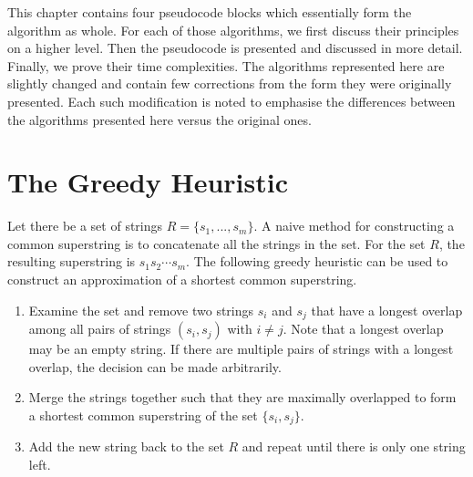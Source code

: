 \documentclass[english,twoside,censored,csm,algorithms-track-2020]{HYthesisML}
\theoremstyle{plain}
\theoremstyle{definition}
\begin{document}
This chapter contains four pseudocode blocks which essentially form the algorithm as whole.
For each of those algorithms, we first discuss their principles on a higher level. Then the pseudocode
is presented and discussed in more detail. Finally, we prove their time complexities.
The algorithms represented here are slightly changed and contain few corrections from the form they
were originally presented. Each such modification is noted to emphasise the differences between
the algorithms presented here versus the original ones.

\listofalgorithms

\section{The Greedy Heuristic}

  

Let there be a set of strings $R=\{s_1,...,s_m\}$. A naive method for constructing a common superstring
is to concatenate all the strings in the set. For the set $R$, the resulting superstring
is $s_1s_2\cdots s_m$.
The following greedy heuristic can be used to construct an approximation of a shortest
common superstring.

\begin{enumerate}
\item Examine the set and remove two strings $s_i$ and $s_j$ that have a longest overlap among all pairs of strings $(s_i, s_j)$ with $i\neq j$. Note that a longest overlap may be an empty string. If there are multiple pairs of strings with a longest overlap, the decision can be made arbitrarily.
\item Merge the strings together such that they are maximally overlapped to form a shortest common superstring of the set $\{s_i, s_j\}$.
  \item Add the new string back to the set $R$ and repeat until there is only one string left.
\end{enumerate}
\end{document}
